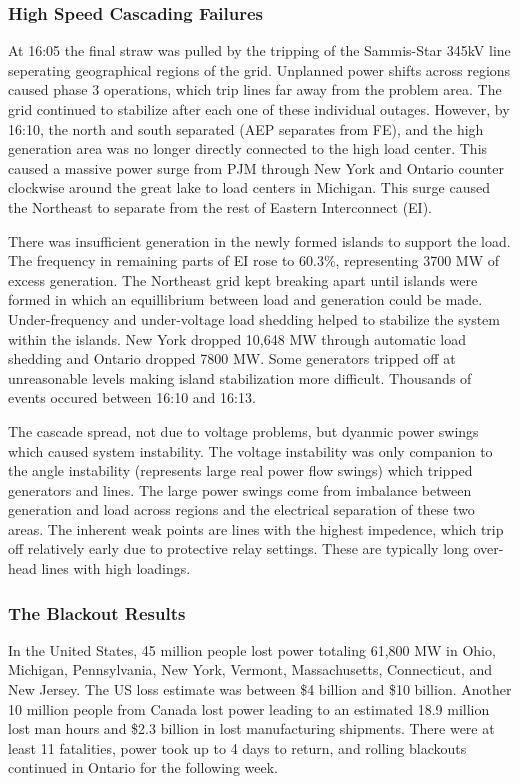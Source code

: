 \subsubsection{High Speed Cascading Failures}
At 16:05 the final straw was pulled by the tripping of the Sammis-Star 345kV line seperating geographical regions of the grid.  Unplanned power shifts across regions caused phase 3 operations, which trip lines far away from the problem area.  The grid continued to stabilize after each one of these individual outages.  However, by 16:10, the north and south separated (AEP separates from FE), and the high generation area was no longer directly connected to the high load center.  This caused a massive power surge from PJM through New York and Ontario counter clockwise around the great lake to load centers in Michigan. This surge caused the Northeast to separate from the rest of Eastern Interconnect (EI).

There was insufficient generation in the newly formed islands to support the load.  The frequency in remaining parts of EI rose to 60.3\%, representing 3700 MW of excess generation.  The Northeast grid kept breaking apart until islands were formed in which an equillibrium between load and generation could be made.  Under-frequency and under-voltage load shedding helped to stabilize the system within the islands.  New York dropped 10,648 MW through automatic load shedding and Ontario dropped 7800 MW.  Some generators tripped off at unreasonable levels making island stabilization more difficult.  Thousands of events occured between 16:10 and 16:13.  

The cascade spread, not due to voltage problems, but dyanmic power swings which caused system instability.  The voltage instability was only companion to the angle instability (represents large real power flow swings) which tripped generators and lines.  The large power swings come from imbalance between generation and load across regions and the electrical separation of these two areas.  The inherent weak points are lines with the highest impedence, which trip off relatively early due to protective relay settings.  These are typically long over-head lines with high loadings.


\subsubsection{The Blackout Results}
In the United States, 45 million people lost power totaling 61,800 MW in Ohio, Michigan, Pennsylvania, New York, Vermont, Massachusetts, Connecticut, and New Jersey.  The US loss estimate was between \$4 billion and \$10 billion.  Another 10 million people from Canada lost power leading to an estimated 18.9 million lost man hours and \$2.3 billion in lost manufacturing shipments.   There were at least 11 fatalities, power took up to 4 days to return, and rolling blackouts continued in Ontario for the following week.\cite{northeast_2003}

